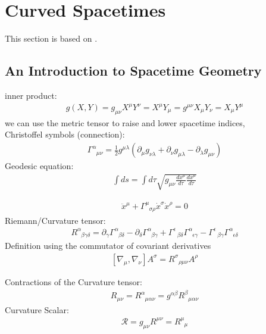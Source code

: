 \chapter{Curved Spacetimes}
This section is based on \cite{CarrollGR}.
\section{An Introduction to Spacetime Geometry}



inner product: 
\begin{align}
	g(X,Y) = g_{\mu\nu}X^{\mu}Y^{\nu} = X^{\mu}Y_{\mu}= g^{\mu\nu}X_{\mu}Y_{\nu} = X_{\mu}Y^{\mu}
\end{align}
we can use the metric tensor to raise and lower spacetime indices, \\
Christoffel symbols (connection):
\begin{align}
\Gamma_{\phantom{\alpha}\mu \nu}^{\alpha}=\frac{1}{2} g^{\mu \lambda}\left(\partial_{\mu} g_{\nu \lambda}+\partial_{\nu} g_{\mu \lambda}-\partial_{\lambda} g_{\mu \nu}\right)	
\end{align}
Geodesic equation:
\begin{align}
	\int d s=\int d \tau \sqrt{g_{\mu \nu} \frac{d x^{\mu}}{d \tau} \frac{d x^{\mu}}{d \tau}}
\end{align}

\begin{align}
	\ddot{x}^{\mu}+\Gamma_{\phantom{\mu}\sigma \rho}^{\mu} \dot{x}^{\sigma} \dot{x}^{\rho}=0
\end{align}
Riemann/Curvature tensor:
\begin{align}
	R_{\phantom{\alpha}\beta \gamma \delta}^{\alpha}=\partial_{\gamma} \Gamma_{\phantom{\alpha}\beta \delta}^{\alpha}-\partial_{\delta} \Gamma_{\phantom{\alpha}\beta \gamma}^{\alpha}+\Gamma_{\phantom{\alpha}\beta \delta}^{\epsilon} \Gamma_{\phantom{\alpha}\epsilon \gamma}^{\alpha}-\Gamma_{\phantom{\alpha}\beta \gamma}^{\epsilon} \Gamma_{\phantom{\alpha}\epsilon \delta}^{\alpha}
\end{align}
Definition using the commutator of covariant derivatives
\begin{align}
	\left[\nabla_{\mu}, \nabla_{\nu}\right] A^{\sigma}=R_{\phantom{\alpha}\rho \mu \nu}^{\sigma} A^{\rho}
\end{align}

Contractions of the Curvature tensor:
\begin{align}
	R_{\mu\nu} = R^{\alpha}_{\phantom{\alpha}\mu\alpha\nu} = g^{\alpha\beta} R^{\beta}_{\phantom{\alpha}\mu\alpha\nu}
\end{align}
Curvature Scalar:
\begin{align}
\mathcal{R} = g_{\mu\nu}R^{\mu\nu} = R^{\mu}_{\phantom{\mu}\mu}
\end{align}



